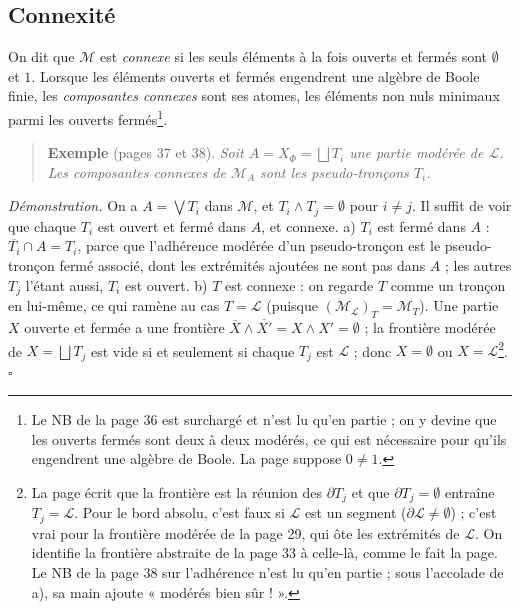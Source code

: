 \documentclass[11pt,a4paper]{article}
\begin{document}
\subsection*{Connexité}

On dit que $\mathcal{M}$ est \emph{connexe} si les seuls éléments à la fois
ouverts et fermés sont $\emptyset$ et $1$. Lorsque les éléments ouverts et
fermés engendrent une algèbre de Boole finie, les \emph{composantes connexes}
sont ses atomes, les éléments non nuls minimaux parmi les ouverts
fermés\footnote{Le NB de la page 36 est surchargé et n'est lu qu'en partie ; on
y devine que les ouverts fermés sont deux à deux modérés, ce qui est nécessaire
pour qu'ils engendrent une algèbre de Boole. La page suppose $0 \neq 1$.}.

\begin{quote}
\textbf{Exemple} (pages 37 et 38). \emph{Soit $A = X_{\Phi} = \bigsqcup T_{i}$
une partie modérée de $\mathcal{L}$. Les composantes connexes de
$\mathcal{M}_{A}$ sont les pseudo-tronçons $T_{i}$.}
\end{quote}

\emph{Démonstration.} On a $A = \bigvee T_{i}$ dans $\mathcal{M}$, et $T_{i}
\wedge T_{j} = \emptyset$ pour $i \neq j$. Il suffit de voir que chaque $T_{i}$
est ouvert et fermé dans $A$, et connexe. a) $T_{i}$ est fermé dans $A$ :
$\overline{T_{i}} \cap A = T_{i}$, parce que l'adhérence modérée d'un
pseudo-tronçon est le pseudo-tronçon fermé associé, dont les extrémités
ajoutées ne sont pas dans $A$ ; les autres $T_{j}$ l'étant aussi, $T_{i}$ est
ouvert. b) $T$ est connexe : on regarde $T$ comme un tronçon en lui-même, ce qui
ramène au cas $T = \mathcal{L}$ (puisque $(\mathcal{M}_{\mathcal{L}})_{T} =
\mathcal{M}_{T}$). Une partie $X$ ouverte et fermée a une frontière
$\overline{X} \wedge \overline{X'} = X \wedge X' = \emptyset$ ; la frontière
modérée de $X = \bigsqcup T_{j}$ est vide si et seulement si chaque $T_{j}$ est
$\mathcal{L}$ ; donc $X = \emptyset$ ou $X = \mathcal{L}$\footnote{La page écrit
que la frontière est la réunion des $\partial T_{j}$ et que $\partial T_{j} =
\emptyset$ entraîne $T_{j} = \mathcal{L}$. Pour le bord absolu, c'est faux si
$\mathcal{L}$ est un segment ($\partial \mathcal{L} \neq \emptyset$) ; c'est
vrai pour la frontière modérée de la page 29, qui ôte les extrémités de
$\mathcal{L}$. On identifie la frontière abstraite de la page 33 à celle-là,
comme le fait la page. Le NB de la page 38 sur l'adhérence n'est lu qu'en
partie ; sous l'accolade de a), sa main ajoute « modérés bien sûr ! ».}.
\hfill$\square$
\end{document}
